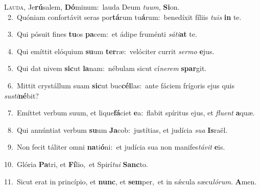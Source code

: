 \lettrine{\initial\textcolor{\initialcolor}{L}}{auda,} Je\-\textbf{rú}\-salem, \textbf{Dó}\-minum:~\star lauda Deum \textit{tu}\-\textit{um}, \textbf{Si}\-on.\\
{\numbfont\textcolor{\numbcolor}{~2.}}~Quóniam confortávit seras por\-\textbf{tá}\-rum tu\-\textbf{á}\-rum:~\star benedíxit fíliis \textit{tu}\-\textit{is} \textbf{in} te.\par
{\numbfont\textcolor{\numbcolor}{~3.}}~Qui pósuit fines \textbf{tu}\-os \textbf{pa}\-cem:~\star et ádipe fruménti \textit{sá}\-\textit{ti}\textbf{at} te.\par
{\numbfont\textcolor{\numbcolor}{~4.}}~Qui emíttit elóquium \textbf{su}\-um \textbf{ter}\-ræ:~\star velóciter currit \textit{ser}\-\textit{mo} \textbf{e}\-jus.\par
{\numbfont\textcolor{\numbcolor}{~5.}}~Qui dat nivem \textbf{sic}\-ut \textbf{la}\-nam:~\star nébulam sicut cí\-\textit{ne}\-\textit{rem} \textbf{spar}\-git.\par
{\numbfont\textcolor{\numbcolor}{~6.}}~Mittit crystállum suam \textbf{sic}\-ut buc\-\textbf{cél}\-las:~\star ante fáciem frígoris ejus quis \textit{sus}\-\textit{ti}\textbf{né}bit?\par
{\numbfont\textcolor{\numbcolor}{~7.}}~Emíttet verbum suum, et lique\-\textbf{fá}\-ciet \textbf{e}\-a:~\star flabit spíritus ejus, et \textit{flu}\-\textit{ent} \textbf{a}\-quæ.\par
{\numbfont\textcolor{\numbcolor}{~8.}}~Qui annúntiat verbum \textbf{su}\-um \textbf{Ja}\-cob:~\star justítias, et judícia \textit{su}\-\textit{a} \textbf{Is}\-raël.\par
{\numbfont\textcolor{\numbcolor}{~9.}}~Non fecit táliter omni \textbf{na}\-ti\-\textbf{ó}\-ni:~\star et judícia sua non manifes\-\textit{tá}\-\textit{vit} \textbf{e}\-is.\par
{\numbfont\textcolor{\numbcolor}{10.}}~Glória \textbf{Pa}\-tri, et \textbf{Fí}\-lio,~\star et Spirí\-\textit{tu}\-\textit{i} \textbf{Sanc}\-to.\par
{\numbfont\textcolor{\numbcolor}{11.}}~Sicut erat in princípio, et \textbf{nunc}\-, et \textbf{sem}\-per,~\star et in sǽcula sæcu\-\textit{ló}\-\textit{rum}. \textbf{A}\-men.\par
